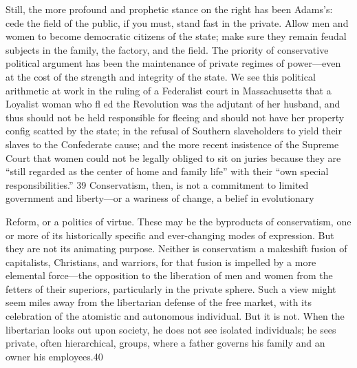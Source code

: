  \par 
Still, the more profound and prophetic stance on the right has been Adams’s: cede the field of the public, if you must, stand fast in the private. Allow men and women to become democratic citizens of the state; make sure they remain feudal subjects in the family, the factory, and the field. The priority of conservative political argument has been the maintenance of private regimes of power—even at the cost of the strength and integrity of the state. We see this political arithmetic at work in the ruling of a Federalist court in Massachusetts that a Loyalist woman who fl ed the Revolution was the adjutant of her husband, and thus should not be held responsible for fleeing and should not have her property config scatted by the state; in the refusal of Southern slaveholders to yield their slaves to the Confederate cause; and the more recent insistence of the Supreme Court that women could not be legally obliged to sit on juries because they are “still regarded as the center of home and family life” with their “own special responsibilities.” {\color{blue}39} Conservatism, then, is not a commitment to limited government and liberty—or a wariness of change, a belief in evolutionary
 \par 
Reform, or a politics of virtue. These may be the byproducts of conservatism, one or more of its historically specific and ever-changing modes of expression. But they are not its animating purpose. Neither is conservatism a makeshift fusion of capitalists, Christians, and warriors, for that fusion is impelled by a more elemental force—the opposition to the liberation of men and women from the fetters of their superiors, particularly in the private sphere. Such a view might seem miles away from the libertarian defense of the free market, with its celebration of the atomistic and autonomous individual. But it is not. When the libertarian looks out upon society, he does not see isolated individuals; he sees private, often hierarchical, groups, where a father governs his family and an owner his employees.{\color{blue}40}
 \par 
